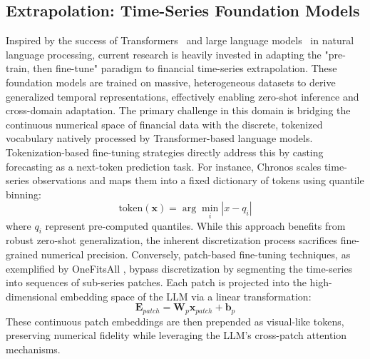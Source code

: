 \subsection{Extrapolation: Time-Series Foundation Models}

Inspired by the success of Transformers~\citep{vaswani2017attention} and large language models~\citep{brown2020language} in natural language processing, current research is heavily invested in adapting the "pre-train, then fine-tune" paradigm to financial time-series extrapolation. These foundation models are trained on massive, heterogeneous datasets to derive generalized temporal representations, effectively enabling zero-shot inference and cross-domain adaptation. The primary challenge in this domain is bridging the continuous numerical space of financial data with the discrete, tokenized vocabulary natively processed by Transformer-based language models. Tokenization-based fine-tuning strategies directly address this by casting forecasting as a next-token prediction task. For instance, Chronos \citep{ansari2024chronos} scales time-series observations and maps them into a fixed dictionary of tokens using quantile binning:
\begin{equation}
\text{token}(\mathbf{x}) = \arg\min_i |x - q_i|
\end{equation}
where $q_i$ represent pre-computed quantiles. While this approach benefits from robust zero-shot generalization, the inherent discretization process sacrifices fine-grained numerical precision. Conversely, patch-based fine-tuning techniques, as exemplified by OneFitsAll \citep{zhou2023onefitsall}, bypass discretization by segmenting the time-series into sequences of sub-series patches. Each patch is projected into the high-dimensional embedding space of the LLM via a linear transformation:
\begin{equation}
\mathbf{E}_{patch} = \mathbf{W}_p \mathbf{x}_{patch} + \mathbf{b}_p
\end{equation}
These continuous patch embeddings are then prepended as visual-like tokens, preserving numerical fidelity while leveraging the LLM's cross-patch attention mechanisms.

